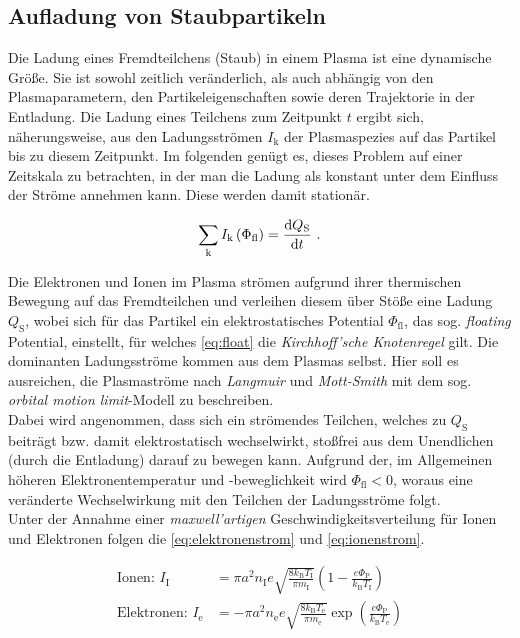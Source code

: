 \documentclass[numbers=noenddot,a4paper,notitlepage,twoside,BCOR15mm]{scrartcl}
\newcommand{\diff}{\textnormal{d}}
\newcommand{\ix}[1]{_\text{#1}}
\newcommand{\tilt}[1]{\textit{#1}}
\begin{document}
		\subsection{Aufladung von Staubpartikeln}\label{sub:ströme}

		Die Ladung eines Fremdteilchens (Staub) in einem Plasma ist eine dynamische Größe. Sie ist sowohl zeitlich veränderlich, als auch abhängig von den Plasmaparametern, den Partikeleigenschaften sowie deren Trajektorie in der Entladung. Die Ladung eines Teilchens zum Zeitpunkt $t$ ergibt sich, näherungsweise, aus den Ladungsströmen $I\ix{k}$ der Plasmaspezies auf das Partikel bis zu diesem Zeitpunkt. Im folgenden genügt es, dieses Problem auf einer Zeitskala zu betrachten, in der man die Ladung als konstant unter dem Einfluss der Ströme annehmen kann. Diese werden damit stationär.

			\begin{align}
				\sum_{\text{k}} I\ix{k}\left(\Phi\ix{fl}\right)=\frac{\diff Q\ix{S}}{\diff t} \,\, . \label{eq:float}
			\end{align}

		Die Elektronen und Ionen im Plasma strömen aufgrund ihrer thermischen Bewegung auf das Fremdteilchen und verleihen diesem über Stöße eine Ladung $Q\ix{S}$, wobei sich für das Partikel ein elektrostatisches Potential $\Phi\ix{fl}$, das sog. \tilt{floating} Potential, einstellt, für welches \autoref{eq:float} die \tilt{Kirchhoff'sche Knotenregel} gilt. Die dominanten Ladungsströme kommen aus dem Plasmas selbst. Hier soll es ausreichen, die Plasmaströme nach \tilt{Langmuir} und \tilt{Mott-Smith} mit dem sog. \tilt{orbital motion limit}-Modell \cite{Langmuir26} zu beschreiben.\\
		Dabei wird angenommen, dass sich ein strömendes Teilchen, welches zu $Q\ix{S}$ beiträgt bzw. damit elektrostatisch wechselwirkt, stoßfrei aus dem Unendlichen (durch die Entladung) darauf zu bewegen kann. Aufgrund der, im Allgemeinen höheren Elektronentemperatur und -beweglichkeit wird $\Phi\ix{fl}<0$, woraus eine veränderte Wechselwirkung mit den Teilchen der Ladungsströme folgt.\\
		Unter der Annahme einer \tilt{maxwell'artigen} Geschwindigkeitsverteilung für Ionen und Elektronen folgen die \autoref{eq:elektronenstrom} und \autoref{eq:ionenstrom}.

			\begin{align}
				\text{Ionen: } I\ix{I}&=\pi a^2n\ix{I}e\sqrt{\frac{8k\ix{B}T\ix{I}}{\pi m\ix{I}}}\left(1-\frac{e\Phi\ix{P}}{k\ix{B}T\ix{I}}\right) \label{eq:ionenstrom} \\
				\text{Elektronen: } I\ix{e}&=-\pi a^2n\ix{e}e\sqrt{\frac{8k\ix{B}T\ix{e}}{\pi m\ix{e}}}\exp\left(\frac{e\Phi\ix{P}}{k\ix{B}T\ix{e}}\right) \label{eq:elektronenstrom}
			\end{align}
\end{document}
